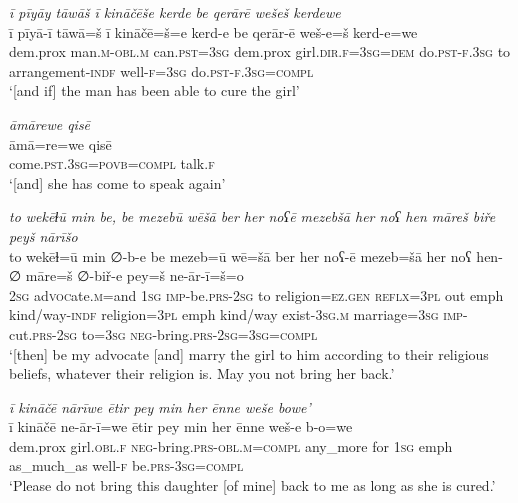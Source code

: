 \ea \label{ZP.45}
\textit{ī pīyāy tāwāš ī kināčēše kerde be qerārē wešeš kerdewe} \\ 
\gll ī pīyā-ī tāwā=š ī kināčē=š=e kerd-e be qerār-ē weš-e=š kerd-e=we \\ 
 dem.prox man\textsc{.m}\textsc{-obl}\textsc{.m} can\textsc{.pst}\textsc{=3sg} dem.prox girl\textsc{.dir}\textsc{.f}\textsc{=3sg}\textsc{=dem} do\textsc{.pst}\textsc{-f}\textsc{.3sg} to arrangement\textsc{-indf} well\textsc{-f}\textsc{=3sg} do\textsc{.pst}\textsc{-f}\textsc{.3sg}\textsc{=compl} \\ 
\glt `[and if] the man has been able to cure the girl'
\z 
 
\ea \label{ZP.46}
\textit{āmārewe qisē} \\ 
\gll āmā=re=we qisē \\ 
 come\textsc{.pst}\textsc{.3sg}\textsc{=\textsc{povb}}\textsc{=\textsc{compl}} talk\textsc{.f} \\ 
\glt `[and] she has come to speak again'
\z 
 
\ea \label{ZP.47}
\textit{to wekēɫū min be, be mezebū wēšā ber her noʕē mezebšā her noʕ hen māreš biře peyš nārīšo} \\ 
\gll to wekēɫ=ū min ∅-b-e be mezeb=ū wē=šā ber her noʕ-ē mezeb=šā her noʕ hen-∅ māre=š ∅-biř-e pey=š ne-ār-ī=š=o \\ 
 \textsc{2sg} ad\textsc{voc}ate\textsc{.m}=and \textsc{1sg} \textsc{imp-}be\textsc{.prs}-\textsc{2sg} to religion\textsc{\textsc{=ez.gen}} \textsc{reflx}\textsc{=3pl} out emph kind/way\textsc{-indf} religion\textsc{=3pl} emph kind/way exist\textsc{-3sg}\textsc{.m} marriage\textsc{=3sg} \textsc{imp-}cut\textsc{.prs}-\textsc{2sg} to\textsc{=3sg} \textsc{neg-}bring\textsc{.prs}\textsc{-2sg}\textsc{=3sg}\textsc{=compl} \\ 
\glt `[then] be my advocate [and] marry the girl to him according to their religious beliefs, whatever their religion is. May you not bring her back.'
\z 
 
\ea \label{ZP.48}
\textit{ī kināčē nārīwe ētir pey min her ēnne weše bowe’} \\ 
\gll ī kināčē ne-ār-ī=we ētir pey min her ēnne weš-e b-o=we \\ 
 dem.prox girl\textsc{.obl}\textsc{.f} \textsc{neg-}bring\textsc{.prs}\textsc{-obl}\textsc{.m}\textsc{=compl} any\_more for \textsc{1sg} emph as\_much\_as well\textsc{-f} be\textsc{.prs}\textsc{-3sg}\textsc{=compl} \\ 
\glt `Please do not bring this daughter [of mine] back to me as long as she is cured.'
\z 
 
